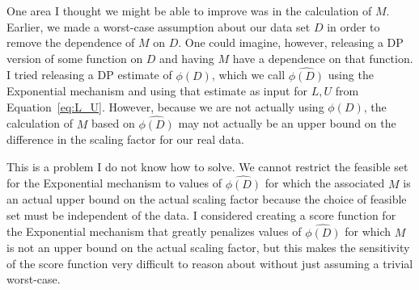 \documentclass[11pt]{scrartcl} %
\begin{document}
One area I thought we might be able to improve was in the calculation of $M$.
Earlier, we made a worst-case assumption about our data set $D$ in order to remove the
dependence of $M$ on $D$. One could imagine, however, releasing a DP version of some function on $D$
and having $M$ have a dependence on that function. I tried releasing a DP estimate of
$\phi(D)$, which we call $\hat{\phi(D)}$ using the Exponential mechanism and using that estimate as input for
$L,U$ from Equation~\ref{eq:L_U}. However, because we are not actually using $\phi(D)$,
the calculation of $M$ based on $\hat{\phi(D)}$ may not actually be an upper bound on the
difference in the scaling factor for our real data. \newline

This is a problem I do not know how to solve.
We cannot restrict the feasible set for the Exponential mechanism to values of $\hat{\phi(D)}$
for which the associated $M$ is an actual upper bound on the actual scaling factor because the choice of feasible
set must be independent of the data. I considered creating a score function for the Exponential mechanism
that greatly penalizes values of $\hat{\phi(D)}$ for which $M$ is not an upper bound on the
actual scaling factor, but this makes the sensitivity of the score function very difficult to reason about
without just assuming a trivial worst-case.



\end{document}
